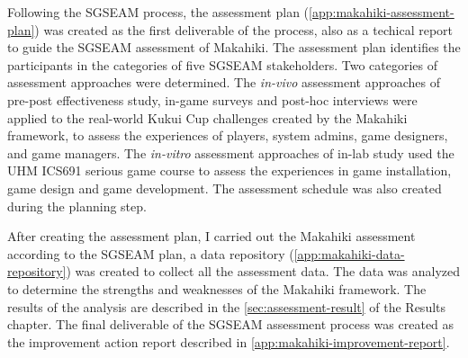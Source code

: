 Following the SGSEAM process, the assessment plan (\autoref{app:makahiki-assessment-plan}) was created as the first deliverable of the process, also as a techical report \cite{csdl2-13-11} to guide the SGSEAM assessment of Makahiki. The assessment plan identifies the participants in the categories of five SGSEAM stakeholders. Two categories of assessment approaches were determined. The {\em in-vivo} assessment approaches of pre-post effectiveness study, in-game surveys and post-hoc interviews were applied to the real-world Kukui Cup challenges created by the Makahiki framework, to assess the experiences of players, system admins, game designers, and game managers. The {\em in-vitro} assessment approaches of in-lab study used the UHM ICS691 serious game course to assess the experiences in game installation, game design and game development. The assessment schedule was also created during the planning step.

After creating the assessment plan, I carried out the Makahiki assessment according to the SGSEAM plan, a data repository (\autoref{app:makahiki-data-repository}) was created to collect all the assessment data. The data was analyzed to determine the strengths and weaknesses of the Makahiki framework. The results of the analysis are described in the \autoref{sec:assessment-result} of the Results chapter. The final deliverable of the SGSEAM assessment process was created as the improvement action report described in \autoref{app:makahiki-improvement-report}.
